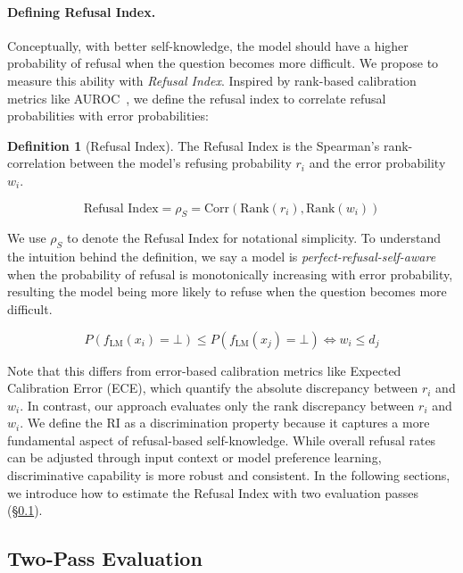 \documentclass{article} %
\theoremstyle{definition}
\newtheorem{definition}{Definition}[section]
\begin{document}
\paragraph{Defining Refusal Index.}
Conceptually, with better self-knowledge, the model should have a higher probability of refusal when the question becomes more difficult. 
We propose to measure this ability with \emph{Refusal Index}. 
Inspired by rank-based calibration metrics like AUROC~\citep{NiculescuMizil2005PredictingGP}, we define the refusal index to correlate refusal probabilities with error probabilities:

\begin{definition}[Refusal Index]
The Refusal Index is the Spearman's rank-correlation between the model's refusing probability $r_i$ and the error probability $w_i$.

\begin{equation}
   \text{Refusal Index} = \rho_S  = \text{Corr}(\text{Rank}(r_i), \text{Rank}(w_i))
\end{equation}

\end{definition}

We use $\rho_S$ to denote the Refusal Index for notational simplicity. 
To understand the intuition behind the definition, we say a model is \emph{perfect-refusal-self-aware} when the probability of refusal is monotonically increasing with error probability, resulting the model being more likely to refuse when the question becomes more difficult.

\begin{equation}
P(f_{\text{LM}}(x_i) = \bot) \leq P(f_{\text{LM}}(x_j) = \bot) \iff w_i \leq d_j
\label{eq:refusal_perfect_calibrated}
\end{equation}

Note that this differs from error-based calibration metrics like Expected Calibration Error (ECE), which quantify the absolute discrepancy between $r_i$ and $w_i$. 
In contrast, our approach evaluates only the rank discrepancy between $r_i$ and $w_i$.
We define the RI as a discrimination property because it captures a more fundamental aspect of refusal-based self-knowledge. 
While overall refusal rates can be adjusted through input context or model preference learning, discriminative capability is more robust and consistent. 
In the following sections, we introduce how to estimate the Refusal Index with two evaluation passes (\S\ref{sec:two_pass_evaluation}).

\subsection{Two-Pass Evaluation}
\label{sec:two_pass_evaluation}
\end{document}
